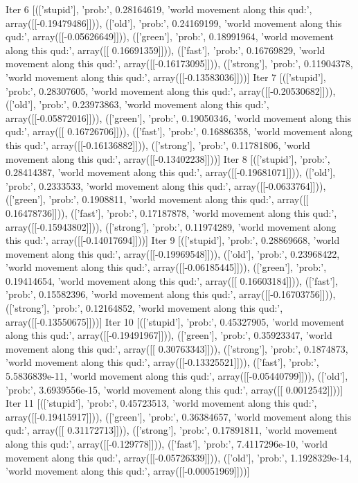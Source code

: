 Iter 6 [(['stupid'], 'prob:', 0.28164619, 'world movement along this qud:', array([[-0.19479486]])), (['old'], 'prob:', 0.24169199, 'world movement along this qud:', array([[-0.05626649]])), (['green'], 'prob:', 0.18991964, 'world movement along this qud:', array([[ 0.16691359]])), (['fast'], 'prob:', 0.16769829, 'world movement along this qud:', array([[-0.16173095]])), (['strong'], 'prob:', 0.11904378, 'world movement along this qud:', array([[-0.13583036]]))]
Iter 7 [(['stupid'], 'prob:', 0.28307605, 'world movement along this qud:', array([[-0.20530682]])), (['old'], 'prob:', 0.23973863, 'world movement along this qud:', array([[-0.05872016]])), (['green'], 'prob:', 0.19050346, 'world movement along this qud:', array([[ 0.16726706]])), (['fast'], 'prob:', 0.16886358, 'world movement along this qud:', array([[-0.16136882]])), (['strong'], 'prob:', 0.11781806, 'world movement along this qud:', array([[-0.13402238]]))]
Iter 8 [(['stupid'], 'prob:', 0.28414387, 'world movement along this qud:', array([[-0.19681071]])), (['old'], 'prob:', 0.2333533, 'world movement along this qud:', array([[-0.0633764]])), (['green'], 'prob:', 0.1908811, 'world movement along this qud:', array([[ 0.16478736]])), (['fast'], 'prob:', 0.17187878, 'world movement along this qud:', array([[-0.15943802]])), (['strong'], 'prob:', 0.11974289, 'world movement along this qud:', array([[-0.14017694]]))]
Iter 9 [(['stupid'], 'prob:', 0.28869668, 'world movement along this qud:', array([[-0.19969548]])), (['old'], 'prob:', 0.23968422, 'world movement along this qud:', array([[-0.06185445]])), (['green'], 'prob:', 0.19414654, 'world movement along this qud:', array([[ 0.16603184]])), (['fast'], 'prob:', 0.15582396, 'world movement along this qud:', array([[-0.16703756]])), (['strong'], 'prob:', 0.12164852, 'world movement along this qud:', array([[-0.13550675]]))]
Iter 10 [(['stupid'], 'prob:', 0.45327905, 'world movement along this qud:', array([[-0.19491967]])), (['green'], 'prob:', 0.35923347, 'world movement along this qud:', array([[ 0.30763343]])), (['strong'], 'prob:', 0.1874873, 'world movement along this qud:', array([[-0.13325521]])), (['fast'], 'prob:', 5.5836839e-11, 'world movement along this qud:', array([[-0.05440799]])), (['old'], 'prob:', 3.6939556e-15, 'world movement along this qud:', array([[ 0.0012542]]))]
Iter 11 [(['stupid'], 'prob:', 0.45723513, 'world movement along this qud:', array([[-0.19415917]])), (['green'], 'prob:', 0.36384657, 'world movement along this qud:', array([[ 0.31172713]])), (['strong'], 'prob:', 0.17891811, 'world movement along this qud:', array([[-0.129778]])), (['fast'], 'prob:', 7.4117296e-10, 'world movement along this qud:', array([[-0.05726339]])), (['old'], 'prob:', 1.1928329e-14, 'world movement along this qud:', array([[-0.00051969]]))]
